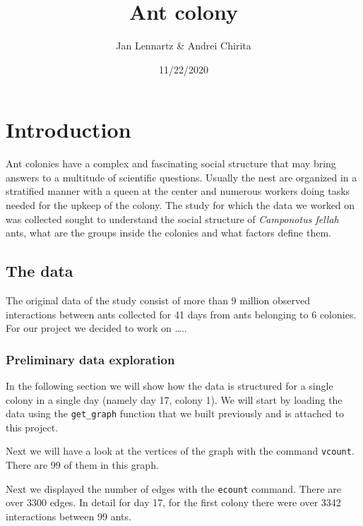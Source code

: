 \documentclass[
]{article}
\title{Ant colony}
\author{Jan Lennartz \& Andrei Chirita}
\date{11/22/2020}
\begin{document}
\maketitle

\newpage
\setcounter{tocdepth}{1}
\tableofcontents
\newpage

\hypertarget{introduction}{%
\section{Introduction}\label{introduction}}

Ant colonies have a complex and fascinating social structure that may
bring answers to a multitude of scientific questions. Usually the nest
are organized in a stratified manner with a queen at the center and
numerous workers doing tasks needed for the upkeep of the colony. The
study for which the data we worked on was collected sought to understand
the social structure of \emph{Camponotus fellah} ants, what are the
groups inside the colonies and what factors define them.

\hypertarget{the-data}{%
\subsection{The data}\label{the-data}}

The original data of the study consist of more than 9 million observed
interactions between ants collected for 41 days from ants belonging to 6
colonies. For our project we decided to work on \ldots..

\hypertarget{preliminary-data-exploration}{%
\subsubsection{Preliminary data
exploration}\label{preliminary-data-exploration}}

In the following section we will show how the data is structured for a
single colony in a single day (namely day 17, colony 1). We will start
by loading the data using the \texttt{get\_graph} function that we built
previously and is attached to this project.

Next we will have a look at the vertices of the graph with the command
\texttt{vcount}. There are 99 of them in this graph.

Next we displayed the number of edges with the \texttt{ecount} command.
There are over 3300 edges. In detail for day 17, for the first colony
there were over 3342 interactions between 99 ants.
\end{document}
